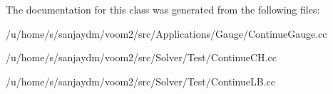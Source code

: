 The documentation for this class was generated from the following files:\begin{DoxyCompactItemize}
\item 
/u/home/s/sanjaydm/voom2/src/Applications/Gauge/ContinueGauge.cc\item 
/u/home/s/sanjaydm/voom2/src/Solver/Test/ContinueCH.cc\item 
/u/home/s/sanjaydm/voom2/src/Solver/Test/ContinueLB.cc\end{DoxyCompactItemize}
